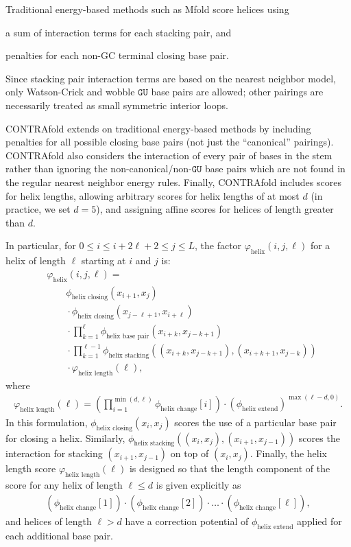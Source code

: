 \documentclass{article}
\newcommand{\U}{\texttt{U}}
\newcommand{\G}{\texttt{G}}
\newcommand{\helix}{\varphi_\text{helix}}
\newcommand{\helixstacking}{\phi_\text{helix stacking}}
\newcommand{\helixbasepair}{\phi_\text{helix base pair}}
\newcommand{\helixextend}{\phi_\text{helix extend}}
\newcommand{\helixclosing}{\phi_\text{helix closing}}
\newcommand{\helixchange}{\phi_\text{helix change}}
\newcommand{\helixlength}{\varphi_\text{helix length}}
\begin{document}
  Traditional energy-based methods such as Mfold score helices using
  \begin{itemize-compact}
  \item a sum of interaction terms for each stacking pair, and
  \item penalties for each non-GC terminal closing base pair.
  \end{itemize-compact}
  Since stacking pair interaction terms are based on the nearest neighbor model, 
  only Watson-Crick and wobble $\G\U$ base pairs are allowed; other pairings
  are necessarily treated as small symmetric interior loops.
  
  CONTRAfold extends on traditional energy-based methods by including penalties
  for all possible closing base pairs (not just the ``canonical'' pairings).  CONTRAfold
  also considers the interaction of every pair of bases in the stem rather than ignoring
  the non-canonical/non-$\G\U$ base pairs which are not found in the regular nearest
  neighbor energy rules.  Finally, CONTRAfold includes scores for helix lengths, allowing
  arbitrary scores for helix lengths of at most $d$ (in practice, we set $d=5$), and assigning
  affine scores for helices of length greater than $d$.
  
  In particular, for $0 \le i \le i + 2\ell+2 \le  j \le L$,
  the factor $\helix(i,j,\ell)$ for a helix of length $\ell$ starting at 
  $i$ and $j$ is:
  \begin{align}
    &\helix(i,j,\ell) = {} \nonumber \\
    &\qquad \helixclosing(x_{i+1},x_j) \nonumber \\
    &\qquad{} \cdot \helixclosing(x_{j-\ell+1},x_{i+\ell}) \nonumber \\
    &\qquad{} \cdot \prod_{k=1}^{\ell}
    \helixbasepair(x_{i+k},x_{j-k+1}) \nonumber \\
    &\qquad{} \cdot \prod_{k=1}^{\ell-1}
    \helixstacking((x_{i+k},x_{j-k+1}),(x_{i+k+1},x_{j-k})) \nonumber \\
    &\qquad{} \cdot \helixlength(\ell),
  \end{align}
  where 
  \begin{align}
    \helixlength(\ell) = 
    \left(\prod_{i=1}^{\min(d,\ell)} \helixchange[i]\right) \cdot
    \left(\helixextend\right)^{\max(\ell-d,0)}.
  \end{align}
  In this formulation, $\helixclosing(x_i,x_j)$ scores the
  use of a particular base pair for closing a helix.
  Similarly, $\helixstacking((x_i,x_j),(x_{i+1},x_{j-1}))$ scores the
  interaction for stacking $(x_{i+1},x_{j-1})$ on top of $(x_i,x_j)$.  
  Finally, the helix length score $\helixlength(\ell)$ is designed so that
  the length component of the score for any helix of length $\ell \le d$ is given explicitly as
  \begin{align}
    (\helixchange[1]) \cdot (\helixchange[2]) \cdot \ldots \cdot (\helixchange[\ell]),
  \end{align}
  and helices of length $\ell > d$ have a correction potential of 
  $\helixextend$ applied for each additional base pair.
\end{document}
